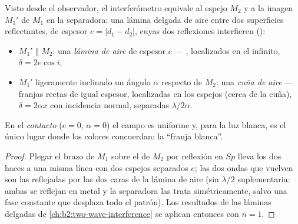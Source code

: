 \begin{proposition}\label{prop:b2:michelson:equivalent}
Visto desde el observador, el interferómetro equivale al espejo
$M_2$ y a la imagen $M_1'$ de $M_1$ en la separadora: una lámina delgada de aire
entre dos superficies reflectantes, de espesor $e = |d_1 - d_2|$, cuyas
dos reflexiones interfieren ():
\begin{itemize}
  \item $M_1' \parallel M_2$: una \emph{lámina de aire} de espesor $e$ --- , localizados en el infinito, $\delta = 2e\cos i$;
  \item $M_1'$ ligeramente inclinado un ángulo $\alpha$ respecto de $M_2$: una \emph{cuña de aire}
        --- franjas rectas de igual espesor, localizadas en los
        espejos (cerca de la cuña), $\delta = 2\alpha x$ con incidencia normal,
        separadas $\lambda/2\alpha$.
\end{itemize}
En el \emph{contacto} ($e = 0$, $\alpha = 0$) el campo es uniforme y, para la luz
blanca, es el único lugar donde los colores concuerdan: la ``franja blanca''.
\end{proposition}

\begin{proof}
Plegar el brazo de $M_1$ sobre el de $M_2$ por reflexión en $Sp$ lleva los
dos haces a una misma línea con dos espejos separados $e$; las dos ondas que
vuelven son las reflejadas por las dos caras de la lámina de aire (sin
$\lambda/2$ suplementaria: ambas se reflejan en metal y la separadora las trata
simétricamente, salvo una fase constante que desplaza todo el patrón).
Los resultados de las láminas delgadas de \cref{ch:b2:two-wave-interference} se aplican entonces
con $n = 1$.
\end{proof}


